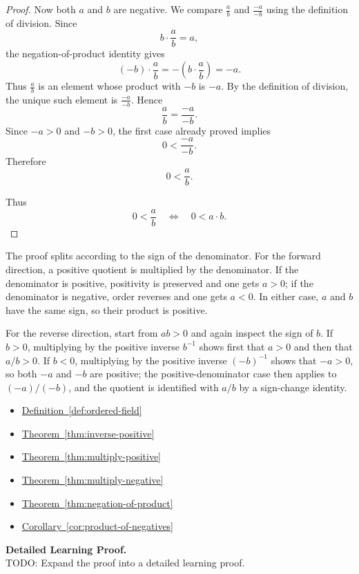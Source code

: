 \begin{proof}
Now both $a$ and $b$ are negative.  We compare $\frac{a}{b}$ and
$\frac{-a}{-b}$ using the definition of division.  Since
\[
b\cdot\frac{a}{b}=a,
\]
the negation-of-product identity gives
\[
(-b)\cdot\frac{a}{b}
=
-\left(b\cdot\frac{a}{b}\right)
=
-a.
\]
Thus $\frac{a}{b}$ is an element whose product with $-b$ is $-a$.  By the
definition of division, the unique such element is $\frac{-a}{-b}$.  Hence
\[
\frac{a}{b}=\frac{-a}{-b}.
\]
Since $-a>0$ and $-b>0$, the first case already proved implies
\[
0<\frac{-a}{-b}.
\]
Therefore
\[
0<\frac{a}{b}.
\]

Thus
\[
0<\frac{a}{b}
\quad\Longleftrightarrow\quad
0<a\cdot b.
\]
\end{proof}

\begin{remark*}
The proof splits according to the sign of the denominator.  For the forward
direction, a positive quotient is multiplied by the denominator.  If the
denominator is positive, positivity is preserved and one gets $a>0$; if the
denominator is negative, order reverses and one gets $a<0$.  In either case,
$a$ and $b$ have the same sign, so their product is positive.

For the reverse direction, start from $ab>0$ and again inspect the sign of
$b$.  If $b>0$, multiplying by the positive inverse $b^{-1}$ shows first that
$a>0$ and then that $a/b>0$.  If $b<0$, multiplying by the positive inverse
$(-b)^{-1}$ shows that $-a>0$, so both $-a$ and $-b$ are positive; the
positive-denominator case then applies to $(-a)/(-b)$, and the quotient is
identified with $a/b$ by a sign-change identity.
\end{remark*}

\begin{dependencies}
\begin{itemize}
  \item \hyperref[def:ordered-field]{Definition~\ref*{def:ordered-field}}
  \item \hyperref[thm:inverse-positive]{Theorem~\ref*{thm:inverse-positive}}
  \item \hyperref[thm:multiply-positive]{Theorem~\ref*{thm:multiply-positive}}
  \item \hyperref[thm:multiply-negative]{Theorem~\ref*{thm:multiply-negative}}
  \item \hyperref[thm:negation-of-product]{Theorem~\ref*{thm:negation-of-product}}
  \item \hyperref[cor:product-of-negatives]{Corollary~\ref*{cor:product-of-negatives}}
\end{itemize}
\end{dependencies}

\textbf{Detailed Learning Proof.}~\\
TODO: Expand the proof into a detailed learning proof.

